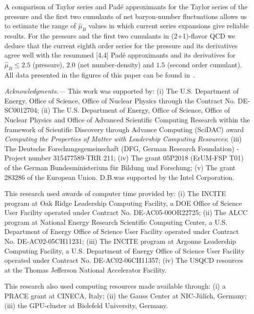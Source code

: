 \documentclass[pdflatex,prd,twocolumn,showpacs,superscriptaddress,nofootinbib]{revtex4-1}
\newcommand \hmu {\hat{\mu}}
\begin{document}
A comparison of Taylor series and Pad\'e
approximants for the Taylor series of the pressure and the first two cumulants of 
net baryon-number fluctuations allows us 
to estimate the range of $\hmu_B$ values in which current series expansions give reliable results. For the pressure and the first two cumulants in (2+1)-flavor QCD we deduce that 
the current eighth order series for the pressure and its derivatives agree well with
the resummed [4,4] Pad\'e approximants and its
derivatives for $\hmu_B\le 2.5$ (pressure),
$2.0$ (net number-density) and $1.5$ (second
order cumulant). All data presented in the figures of this paper can be
found in~\cite{pubdata}.

\vspace{0.5cm}
\emph{Acknowledgments.---} 
This work was supported by: (i) The U.S. Department of Energy, Office of
Science, Office of Nuclear Physics through the Contract No. DE-SC0012704;
(ii) The U.S. Department of Energy, Office of Science, Office of Nuclear
Physics and Office of Advanced Scientific Computing Research within the
framework of Scientific Discovery through Advance Computing (SciDAC) award
{\it Computing the Properties of Matter with Leadership Computing Resources};
(iii) The Deutsche Forschungsgemeinschaft (DFG, German Research Foundation) - Project number 315477589-TRR 211;
(iv) The grant 05P2018 (ErUM-FSP T01) of the German Bundesministerium f\"ur Bildung und Forschung;
(v) The grant 283286 of the European Union.
D.B.was supported by the Intel Corporation.

This research used awards of computer time provided by:
(i) The INCITE program at Oak Ridge Leadership Computing Facility, a DOE
Office of Science User Facility operated under Contract No. DE-AC05-00OR22725;
(ii) The ALCC program at National Energy Research Scientific Computing Center,
a U.S. Department of Energy Office of Science User Facility operated under
Contract No. DE-AC02-05CH11231;
(iii) The INCITE program at Argonne Leadership Computing Facility, a U.S.
Department of Energy Office of Science User Facility operated under Contract
No. DE-AC02-06CH11357;
(iv) The USQCD resources at the Thomas Jefferson National Accelerator Facility.

This research also used computing resources made available through:
(i) a  PRACE grant at CINECA, Italy;
(ii) the Gauss Center at NIC-J\"ulich, Germany;
(iii) the GPU-cluster at Bielefeld University, Germany.
\vspace{0.2cm}


\appendix
\allowdisplaybreaks
\end{document}
